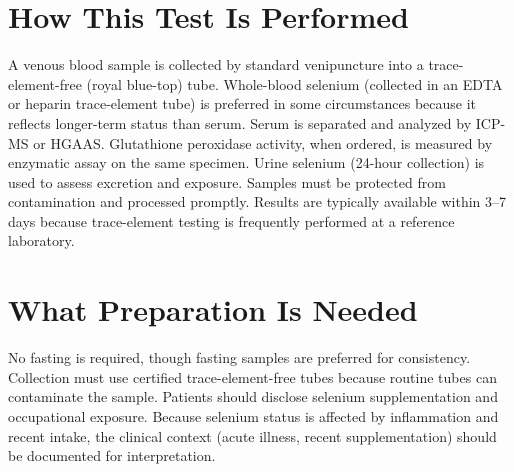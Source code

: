 \section*{How This Test Is Performed}
A venous blood sample is collected by standard venipuncture into a trace-element-free (royal blue-top) tube. Whole-blood selenium (collected in an EDTA or heparin trace-element tube) is preferred in some circumstances because it reflects longer-term status than serum. Serum is separated and analyzed by ICP-MS or HGAAS. Glutathione peroxidase activity, when ordered, is measured by enzymatic assay on the same specimen. Urine selenium (24-hour collection) is used to assess excretion and exposure. Samples must be protected from contamination and processed promptly. Results are typically available within 3--7 days because trace-element testing is frequently performed at a reference laboratory.

\section*{What Preparation Is Needed}
No fasting is required, though fasting samples are preferred for consistency. Collection must use certified trace-element-free tubes because routine tubes can contaminate the sample. Patients should disclose selenium supplementation and occupational exposure. Because selenium status is affected by inflammation and recent intake, the clinical context (acute illness, recent supplementation) should be documented for interpretation.


